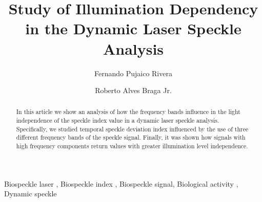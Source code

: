 \documentclass[review]{elsarticle}
\begin{document}
 

\begin{frontmatter}

\title{Study of Illumination Dependency  in the Dynamic Laser Speckle Analysis}



\author{Fernando Pujaico Rivera}
\author{Roberto Alves Braga Jr.}



\address{University Federal of Lavras, Lavras, Brazil}
% 


\begin{abstract}
In this article we show an analysis of how the frequency bands 
influence in the light independence of the speckle index value in a dynamic laser speckle analysis. 
Specifically, 
we studied temporal speckle deviation 
index influenced by the use of three different frequency bands of the speckle signal. 
Finally, it was shown how signals with high frequency components return values with greater illumination level independence.
\end{abstract}

\begin{keyword}
Biospeckle laser \sep 
Biospeckle index \sep 
Biospeckle signal\sep 
Biological activity \sep
Dynamic speckle 
\end{keyword}

\end{frontmatter}

\linenumbers

\end{document}
